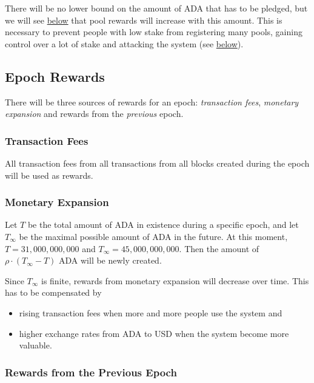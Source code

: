\documentclass[11pt,a4paper]{article}
\begin{document}
There will be no lower bound on the amount of ADA that has to be
pledged, but we will see \hyperref[pool-rewards]{below} that pool
rewards will increase with this amount. This is necessary to prevent
people with low stake from registering many pools, gaining control over
a lot of stake and attacking the system (see \hyperref[aux5f0]{below}).

\subsection{Epoch Rewards}
\label{epoch-rewards}

There will be three sources of rewards for an epoch: \emph{transaction
fees}, \emph{monetary expansion} and rewards from the \emph{previous}
epoch.

\subsubsection{Transaction Fees}
\label{transaction-fees-1}

All transaction fees from all transactions from all blocks created
during the epoch will be used as rewards.

\subsubsection{Monetary Expansion}
\label{monetary-expansion}

Let \(T\) be the total amount of ADA in existence during a specific
epoch, and let \(T_\infty\) be the maximal possible amount of ADA in the
future. At this moment, \(T=31,000,000,000\) and
\(T_\infty=45,000,000,000\). Then the amount of
\(\rho\cdot(T_\infty - T)\) ADA will be newly created.

Since \(T_\infty\) is finite, rewards from monetary expansion will
decrease over time. This has to be compensated by

\begin{itemize}
\item
  rising transaction fees when more and more people use the system and
\item
  higher exchange rates from ADA to USD when the system become more
  valuable.
\end{itemize}

\subsubsection{Rewards from the Previous Epoch}
\label{rewards-from-the-previous-epoch}
\end{document}
